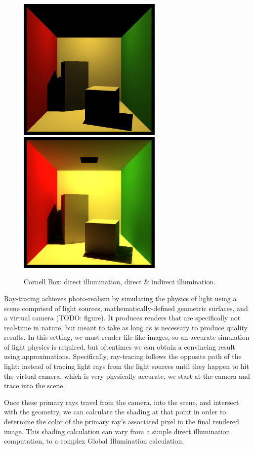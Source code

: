 \begin{figure}[h!]
    \centering
    \includegraphics[width=70mm]{../img/cornell_simp_direct_only.png}
    \includegraphics[width=70mm]{../img/cornell_simp_indirect.png}
    \caption{Cornell Box: direct illumination, direct \& indirect illumination.}
    \label{fig:compare_illumination}
\end{figure}

Ray-tracing achieves photo-realism by simulating the physics of light using a scene comprised of light sources, mathematically-defined geometric surfaces, and a virtual camera (TODO: figure). It produces renders that are specifically not real-time in nature, but meant to take as long as is necessary to produce quality results. In this setting, we must render life-like images, so an accurate simulation of light physics is required, but oftentimes we can obtain a convincing result using approximations. Specifically, ray-tracing follows the opposite path of the light: instead of tracing light rays from the light sources until they happen to hit the virtual camera, which is very physically accurate, we start at the camera and trace into the scene.

Once these primary rays travel from the camera, into the scene, and intersect with the geometry, we can calculate the shading at that point in order to determine the color of the primary ray's associated pixel in the final rendered image. This shading calculation can vary from a simple direct illumination computation, to a complex Global Illumination calculation.

